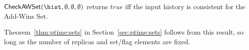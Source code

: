 \begin{theorem}

  $\mathsf{CheckAWSet}(\hist,\emptyset,\emptyset,\emptyset)$ returns $\mathit{true}$ iff the input history is consistent for the Add-Wins Set.

\end{theorem}

Theorem~\ref{thm:ptime:sets} in Section~\ref{sec:ptime:sets} follows from this result, so long as the number of replicas and set/flag elements are fixed.
